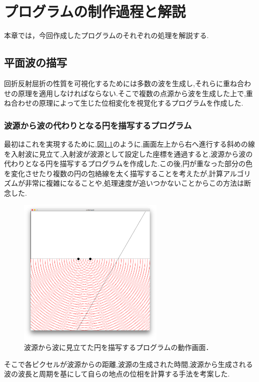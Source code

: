 \chapter{プログラムの制作過程と解説}
本章では，今回作成したプログラムのそれぞれの処理を解説する.
\section{平面波の描写}
回折反射屈折の性質を可視化するためには多数の波を生成し,それらに重ね合わせの原理を適用しなければならない.そこで複数の点源から波を生成した上で,重ね合わせの原理によって生じた位相変化を視覚化するプログラムを作成した.

\subsection{波源から波の代わりとなる円を描写するプログラム}
最初はこれを実現するために,図\ref{fig:missdraw}のように,画面左上から右へ進行する斜めの線を入射波に見立て,入射波が波源として設定した座標を通過すると,波源から波の代わりとなる円を描写するプログラムを作成した.この後,円が重なった部分の色を変化させたり複数の円の包絡線を太く描写することを考えたが,計算アルゴリズムが非常に複雑になることや,処理速度が追いつかないことからこの方法は断念した.

\begin{figure}[htbp]
 \begin{center}
  \includegraphics[width=70mm]{../implement/miss_draw.png}
 \end{center}
 \caption{波源から波に見立てた円を描写するプログラムの動作画面．}
 \label{fig:missdraw}
\end{figure}

\newpage
そこで各ピクセルが波源からの距離,波源の生成された時間,波源から生成される波の波長と周期を基にして自らの地点の位相を計算する手法を考案した.

